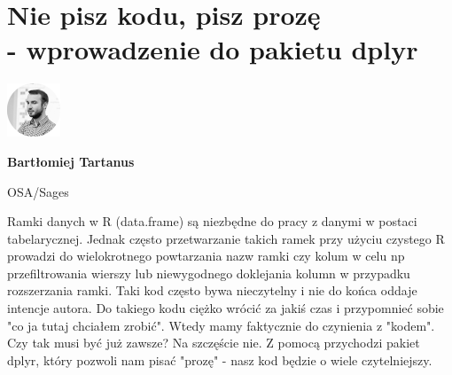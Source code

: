 \documentclass[\main/boa.tex]{subfiles}
\begin{document}
\section[Nie pisz kodu, pisz prozę - wprowadzenie do pakietu dplyr]{Nie pisz kodu, pisz prozę \\- wprowadzenie do pakietu dplyr}
\begin{minipage}[t]{0.915\textwidth}
	\center     
    \includegraphics[width=60px]{img/workshops/czarno_biale/bartek-crop.png} 
\end{minipage}

\begin{minipage}{0.915\textwidth}
\centering
{\bf {} Bartłomiej Tartanus}
\end{minipage}

\vskip 0.3cm

\begin{affiliations}
\begin{minipage}{0.915\textwidth}
\centering
\large OSA/Sages  \\[2pt]
\end{minipage}
\end{affiliations}

\vskip 0.8cm

\opiswarsztatu Ramki danych w R (data.frame) są niezbędne do pracy z danymi w postaci tabelarycznej. Jednak często przetwarzanie takich ramek przy użyciu czystego R prowadzi do wielokrotnego powtarzania nazw ramki czy kolum w celu np przefiltrowania wierszy lub niewygodnego doklejania kolumn w przypadku rozszerzania ramki. Taki kod często bywa nieczytelny i nie do końca oddaje intencje autora. Do takiego kodu ciężko wrócić za jakiś czas i przypomnieć sobie "co ja tutaj chciałem zrobić". Wtedy mamy faktycznie do czynienia z "kodem". Czy tak musi być już zawsze? Na szczęście nie. Z pomocą przychodzi pakiet dplyr, który pozwoli nam pisać "prozę" - nasz kod będzie o wiele czytelniejszy.	 
\end{document}
